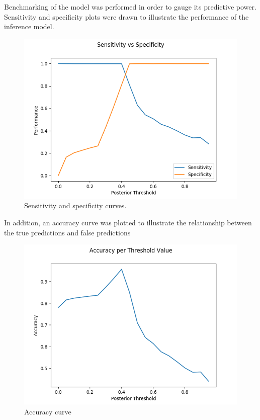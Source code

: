\documentclass[12pt]{article}
\begin{document}
\pagebreak

Benchmarking of the model was performed in order to gauge its predictive power.
Sensitivity and specificity plots were drawn to illustrate the performance
of the inference model.

\pagebreak

\begin{figure}[ht]
\centering
    \includegraphics[width=\textwidth,height=\textheight,keepaspectratio]{../analysis/svs.png}
    \caption{Sensitivity and specificity curves.}
\end{figure}

In addition, an accuracy curve was plotted to illustrate the relationship
between the true predictions and false predictions

\begin{figure}[ht]
\centering
    \includegraphics[width=\textwidth,height=\textheight,keepaspectratio]{../analysis/acc.png}
    \caption{Accuracy curve}
\end{figure}
\end{document}
